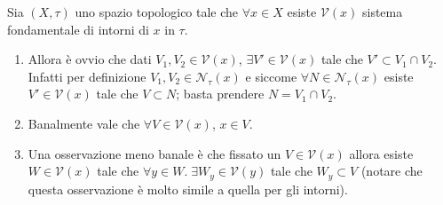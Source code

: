 \begin{remark}
	Sia $(X, \tau)$ uno spazio topologico tale che $\forall x \in X$ esiste $\mathcal{V}(x)$ sistema fondamentale di intorni di $x$ in $\tau$.
	\begin{enumerate}
		\item  Allora è ovvio che dati $V_1, V_2 \in \mathcal{V}(x)$, $\exists V' \in \mathcal{V}(x)$ tale che $V' \subset V_1 \cap V_2$. \\ Infatti per definizione $V_1, V_2 \in \mathcal{N}_\tau(x)$ e siccome $\forall N \in \mathcal{N}_\tau(x)$ esiste $V' \in \mathcal{V}(x)$ tale che $V \subset N$; basta prendere $N = V_1 \cap V_2$.
		\item Banalmente vale che $\forall V \in \mathcal{V}(x)$, $x \in V$.
		\item Una osservazione meno banale è che fissato un $V \in \mathcal{V}(x)$ allora esiste $W \in \mathcal{V}(x)$ tale che $\forall y \in W.\; \exists W_y \in \mathcal{V}(y)$ tale che $W_y \subset V$ (notare che questa osservazione è molto simile a quella per gli intorni).	
	\end{enumerate}
\end{remark}

